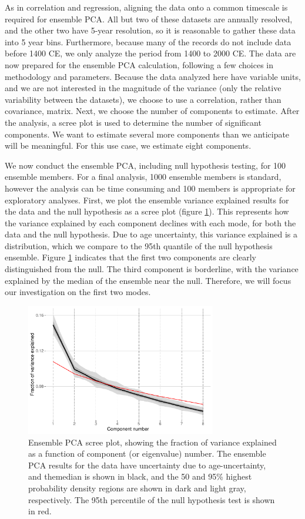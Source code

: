 \documentclass[gchron, manuscript]{copernicus}
\begin{document}
As in correlation and regression, aligning the data onto a common timescale is required for ensemble PCA.
All but two of these datasets are annually resolved, and the other two have 5-year resolution, so it is reasonable to gather these data into 5 year bins.
Furthermore, because many of the records do not include data before 1400 CE, we only analyze the period from 1400 to 2000 CE.
The data are now prepared for the ensemble PCA calculation, following a few choices in methodology and parameters.
Because the data analyzed here have variable units, and we are not interested in the magnitude of the variance (only the relative variability between the datasets), we choose to use a correlation, rather than covariance, matrix.
Next, we choose the number of components to estimate.
After the analysis, a scree plot is used to determine the number of significant components. We want to estimate several more components than we anticipate will be meaningful.
For this use case, we estimate eight components.

We now conduct the ensemble PCA, including null hypothesis testing, for 100 ensemble members.
For a final analysis, 1000 ensemble members is standard, however the analysis can be time consuming and 100 members is appropriate for exploratory analyses.
First, we plot the ensemble variance explained results for the data and the null hypothesis as a scree plot (figure \ref{fig:scree}).
This represents how the variance explained by each component declines with each mode, for both the data and the null hypothesis. Due to age uncertainty, this variance explained is a distribution, which we compare to the 95th quantile of the null hypothesis ensemble.
Figure \ref{fig:scree} indicates that the first two components are clearly distinguished from the null.
The third component is borderline, with the variance explained by the median of the ensemble near the null.
Therefore, we will focus our investigation on the first two modes.

\begin{figure}
\includegraphics[width=8.3cm]{geoChronR-paper_files/figure-latex/scree-1} \caption{Ensemble PCA scree plot, showing the fraction of variance explained as a function of component (or eigenvalue) number. The ensemble PCA results for the data have uncertainty due to age-uncertainty, and themedian is shown in black, and the 50 and 95\% highest probability density regions are shown in dark and light gray, respectively. The 95th percentile of the null hypothesis test is shown in red.}\label{fig:scree}
\end{figure}
\end{document}
